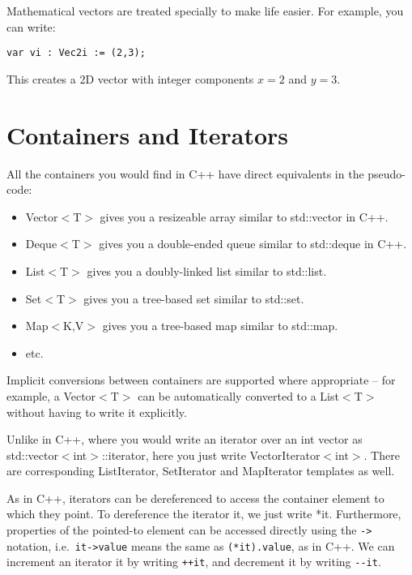 Mathematical vectors are treated specially to make life easier. For example, you can write:
%
\begin{lstlisting}[style=Snippet]
var vi : Vec2i := (2,3);
\end{lstlisting}
%
This creates a 2D vector with integer components $x = 2$ and $y = 3$.

\section{Containers and Iterators}

All the containers you would find in C++ have direct equivalents in the pseudo-code:
%
\begin{itemize}
\item Vector$<$T$>$ gives you a resizeable array similar to std::vector in C++.
\item Deque$<$T$>$ gives you a double-ended queue similar to std::deque in C++.
\item List$<$T$>$ gives you a doubly-linked list similar to std::list.
\item Set$<$T$>$ gives you a tree-based set similar to std::set.
\item Map$<$K,V$>$ gives you a tree-based map similar to std::map.
\item etc.
\end{itemize}
%
Implicit conversions between containers are supported where appropriate -- for example, a Vector$<$T$>$ can be automatically converted to a List$<$T$>$ without having to write it explicitly.

Unlike in C++, where you would write an iterator over an int vector as std::vector$<$int$>$::iterator, here you just write VectorIterator$<$int$>$. There are corresponding ListIterator, SetIterator and MapIterator templates as well.

As in C++, iterators can be dereferenced to access the container element to which they point. To dereference the iterator it, we just write *it. Furthermore, properties of the pointed-to element can be accessed directly using the \lstinline[language=Pseudocode]$->$ notation, i.e.~\lstinline[language=Pseudocode]$it->value$ means the same as \lstinline[language=Pseudocode]$(*it).value$, as in C++. We can increment an iterator it by writing \lstinline[language=Pseudocode]$++it$, and decrement it by writing \lstinline[language=Pseudocode]$--it$.

